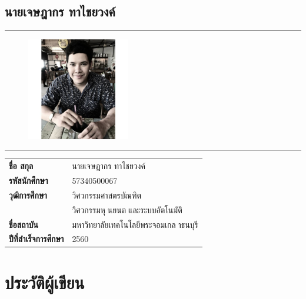 \section*{นายเจษฎากร ทาไชยวงค์}
\hrule height .7pt
\begin{figure}[!ht]
	\centering
	\includegraphics[width=0.4\textwidth]{pages/images/taa.jpg}
\end{figure}
\hrule height .7pt
\raggedright
\begin{tabular}{p{} p{}}
    \textbf{ชื่อ สกุล} & {นายเจษฎากร ทาไชยวงค์} \\
    \textbf{รหัสนักศึกษา} & {57340500067}\\
    \textbf{วุฒิการศึกษา} & {วิศวกรรมศาสตรบัณฑิต} \\
    {} & {วิศวกรรมหุนยนตและระบบอัตโนมัติ}\\
    \textbf{ชื่อสถาบัน} & {มหาวิทยาลัยเทคโนโลยีพระจอมเกลาธนบุรี} \\
    \textbf{ปีที่สำเร็จการศึกษา} & {2560} \\
\end{tabular}   

\chapter*{ประวัติผู้เขียน}
